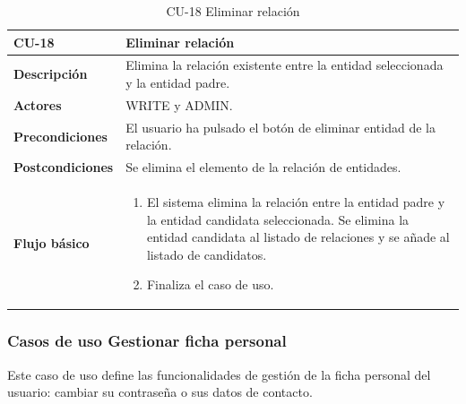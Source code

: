 \begin{table} [H]
    \centering
    \setlength{\leftmargini}{0.4cm}
	\resizebox{14cm}{!} { %
    \begin{tabular}{| m{3cm} | m{11cm} |}   
    \hline
	  \textbf{CU-18} & \textbf{Eliminar relación} \\\hline
	  \textbf{Descripción} & Elimina la relación existente entre la entidad seleccionada y la entidad padre. \\\hline
	  \textbf{Actores} & WRITE y ADMIN. \\\hline
	  \textbf{Precondiciones} & El usuario ha pulsado el botón de eliminar entidad de la relación. \\\hline
	  \textbf{Postcondiciones} & Se elimina el elemento de la relación de entidades. \\\hline
	  \textbf{Flujo básico} & 
		\begin{enumerate}
	  	\item El sistema elimina la relación entre la entidad padre y la entidad candidata seleccionada. Se elimina la entidad candidata al listado de relaciones y se añade al listado de candidatos.
		\item Finaliza el caso de uso.				
	  \end{enumerate} 	  	  
	  \\\hline
    \end{tabular}
    } %
    \caption{CU-18 Eliminar relación}
    \label{tab:cu-eliminar-relacion}
\end{table}


\subsubsection{Casos de uso Gestionar ficha personal} 
\label{sub:cu-ficha}

Este caso de uso define las funcionalidades de gestión de la ficha personal del usuario: cambiar su contraseña o sus datos de contacto.

